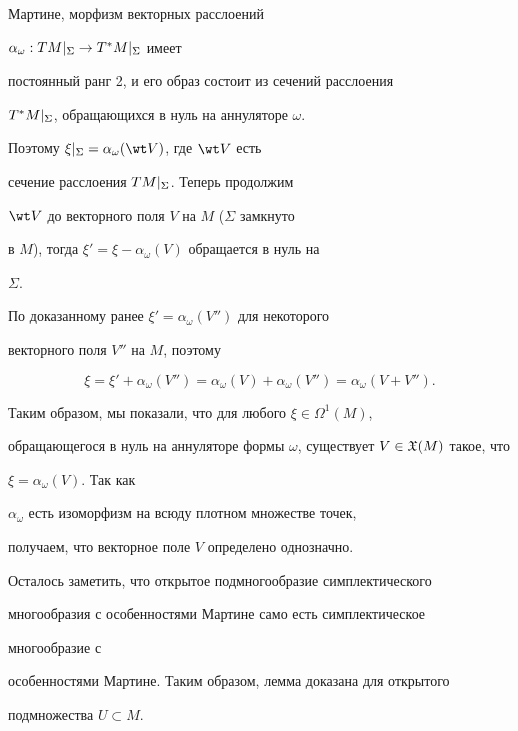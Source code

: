 \begin{pf}
Мартине, морфизм векторных расслоений


$\alpha_\omega : TM |_{\Sigma} \to T^*M |_{\Sigma}$ имеет


постоянный ранг 2, и его образ состоит из сечений расслоения


$T^*M |_{\Sigma}$, обращающихся в нуль на аннуляторе $\omega$.


Поэтому $\rest{\xi}{\Sigma} = \alpha_\omega(\wt V)$, где $\wt V$ есть


сечение расслоения $TM |_{\Sigma}$. Теперь продолжим


$\wt V$ до векторного поля $V$ на $M$ ($\Sigma$ замкнуто


в $M$), тогда $\xi' = \xi - \alpha_\omega(V)$ обращается в нуль на


$\Sigma$.


По доказанному ранее $\xi' = \alpha_\omega(V'')$ для некоторого


векторного поля $V''$ на $M$, поэтому


$$


\xi = \xi' + \alpha_\omega(V'') =


\alpha_\omega(V)+\alpha_\omega(V'')=\alpha_\omega(V+V'').


$$





Таким образом, мы показали, что для любого $\xi \in \Omega^1(M)$,


обращающегося в нуль на аннуляторе формы $\omega$, существует $V \in


\gX(M)$ такое, что


$\xi = \alpha_\omega(V)$. Так как


$\alpha_\omega$ есть изоморфизм на всюду плотном множестве точек,


получаем, что векторное поле $V$ определено однозначно.





Осталось заметить, что открытое подмногообразие симплектического


многообразия с особенностями Мартине само есть симплектическое


многообразие с


особенностями Мартине. Таким образом, лемма доказана для открытого


подмножества $U \subset M$.


\end{pf}








